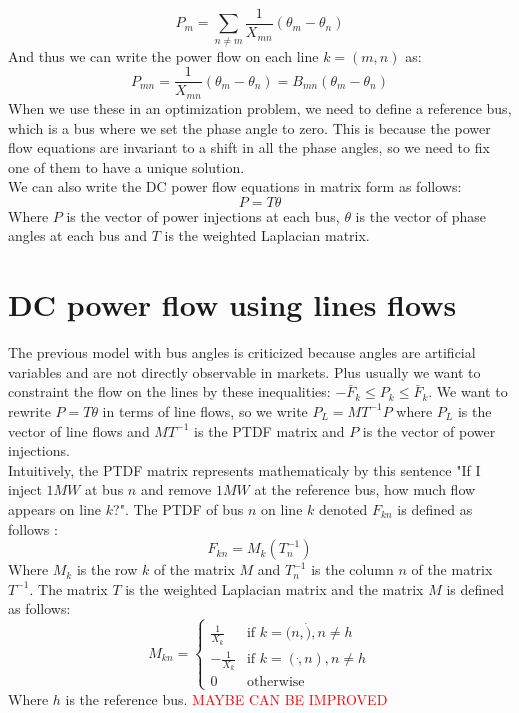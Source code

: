 \documentclass[12pt, openany]{report}
\theoremstyle{definition}
\begin{document}
\begin{equation}
    P_{m} = \sum_{n \neq m} \frac{1}{X_{mn}} (\theta_m - \theta_n)
\end{equation}
And thus we can write the power flow on each line $k = (m,n)$ as:
\begin{equation}
    P_{mn} = \frac{1}{X_{mn}} (\theta_m - \theta_n) = B_{mn} (\theta_m - \theta_n)
\end{equation}
When we use these in an optimization problem, we need to define a reference bus, which is a bus where we set the phase angle to zero. This is because the power flow equations are invariant to a shift in all the phase angles, so we need to fix one of them to have a unique solution.\\
We can also write the DC power flow equations in matrix form as follows:
\begin{equation}
    P = T \theta
\end{equation}
Where $P$ is the vector of power injections at each bus, $\theta$ is the vector of phase angles at each bus and $T$ is the weighted Laplacian matrix.
\section{DC power flow using lines flows}
The previous model with bus angles is criticized because angles are artificial variables and are not directly observable in markets. Plus usually we want to constraint the flow on the lines by these inequalities: $-\bar{F}_k \leq P_k \leq \bar{F}_k$. We want to rewrite $P = T \theta$ in terms of line flows, so we write $P_L = MT^{-1} P$ where $P_L$ is the vector of line flows and $M T^{-1}$ is the PTDF matrix and $P$ is the vector of power injections.\\
Intuitively, the PTDF matrix represents mathematicaly by this sentence "If I inject $1 MW$ at bus $n$ and remove $1 MW$ at the reference bus, how much flow appears on line $k$?". The PTDF of bus $n$ on line $k$ denoted $F_{kn}$ is defined as follows :
\begin{equation}
    F_{kn} = M_k (T^{-1}_n) 
\end{equation}
Where $M_k$ is the row $k$ of the matrix $M$ and $T^{-1}_n$ is the column $n$ of the matrix $T^{-1}$. The matrix $T$ is the weighted Laplacian matrix and the matrix $M$ is defined as follows:
\begin{equation}
    M_{kn} = \begin{cases}
        \frac{1}{X_k} & \text{if } k = (n, \dot), n \neq h\\
        -\frac{1}{X_k} & \text{if } k = (\dot, n), n \neq h\\
        0 & \text{otherwise}
    \end{cases}
\end{equation}
Where $h$ is the reference bus.
\textcolor{red}{MAYBE CAN BE IMPROVED}
\end{document}
